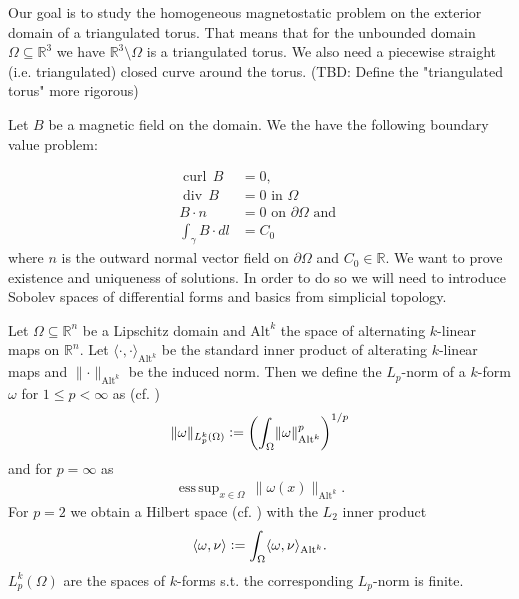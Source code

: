 \documentclass[12pt,a4paper]{article}
\theoremstyle{definition}
\DeclareMathOperator*{\esssup}{ess\,sup}
\DeclareMathOperator{\curl}{curl}
\DeclareMathOperator{\diver}{div}
\newcommand{\real}{\mathbb{R}}
\begin{document}
Our goal is to study the homogeneous magnetostatic problem on the exterior 
domain of a triangulated torus. That means 
that for the unbounded domain  $\Omega \subseteq \real^3$ we have
$\real^3 \setminus \Omega$ is a triangulated torus. We also need a 
piecewise straight (i.e. triangulated) closed curve around the torus.
{\color{red} (TBD: Define the "triangulated torus" more rigorous)}

Let $B$ be a magnetic field on the domain.
We the have the following boundary value problem:

\begin{align}
    \curl \, B &= 0, \\ 
    \diver \, B  &= 0 \text{ in } \Omega \\
    B \cdot n &= 0 \text{ on } \partial \Omega \text{ and }\\
    \int_\gamma B \cdot dl &= C_0
\end{align}
where $n$ is the outward normal vector field on $\partial \Omega$ and 
$C_0 \in \real$. We want to prove existence and uniqueness of 
solutions. In order to do so we will need to introduce Sobolev spaces of 
differential forms and basics from
simplicial topology.


Let $\Omega \subseteq \real^n$ be a Lipschitz domain and $\text{Alt}^k$ 
the space of alternating $k$-linear maps on $\real^n$. 
Let $\langle \cdot,\cdot\rangle_{\text{Alt}^k}$ be the standard inner
product of alterating $k$-linear maps and 
$\lVert \cdot \rVert _{\text{Alt}^k}$ be the induced norm. Then
we define the $L_p$-norm of a $k$-form $\omega$ for $1\leq p < \infty$
as (cf. \cite{goldshtein})
\begin{align*}
\lVert \omega \rVert _{L_p^k(\Omega)}\vcentcolon=
\left(\int_\Omega \lVert \omega \rVert _{\text{Alt}^k}^p \right)^{1/p}
\end{align*}
and for $p=\infty$ as
\begin{align*}
\esssup_{x\in \Omega} \, \lVert \omega(x) \rVert _{\text{Alt}^k}.
\end{align*}
For $p=2$ we obtain a Hilbert space (cf. \cite[Sec. 6.2.6]{arnold}) 
with the $L_2$ inner product  
\begin{align*}
\langle \omega, \nu \rangle \vcentcolon= 
\int_\Omega \langle \omega, \nu \rangle _{\text{Alt}^k}.
\end{align*}
$L_p^k(\Omega)$ are the spaces of $k$-forms 
s.t. the corresponding $L_p$-norm is finite. \par
\end{document}
